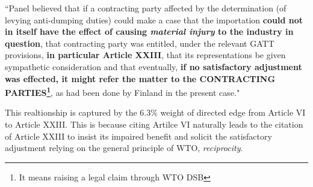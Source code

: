 \begin{displayquote}[]
    ``Panel believed that if a contracting party
    affected by the determination (of levying anti-dumping duties) could make a case that the importation \textbf{could not in itself have the effect of
    causing \textit{material injury} to the industry in question}, that contracting party was entitled, under the relevant
    GATT provisions, \textbf{in particular Article XXIII}, that its representations be given sympathetic consideration
    and that eventually, \textbf{if no satisfactory adjustment was effected, it might refer the matter to the CONTRACTING
    PARTIES\footnote{It means raising a legal claim through WTO DSB}}, as had been done by Finland in the present case."
\end{displayquote}

This realtionship is captured by the $6.3\%$ weight of directed edge from Article VI to Article XXIII. This is because citing Artilce VI naturally leads to the citation of Article XXIII to insist its impaired benefit and solicit the satisfactory adjustment relying on the general principle of WTO, \textit{reciprocity}. 


